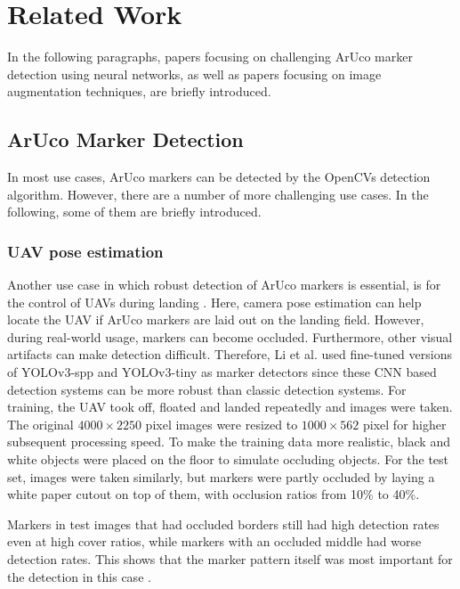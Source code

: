 \documentclass[10pt]{book}
\begin{document}
\chapter{Related Work}
\label{chap:relatedw}

In the following paragraphs, papers focusing on challenging \ac{ArUco} marker detection using neural networks, as well as papers focusing on image augmentation techniques, are briefly introduced.

\section{ArUco Marker Detection}

In most use cases, \ac{ArUco} markers can be detected by the \acp{OpenCV} detection algorithm. However, there are a number of more challenging use cases. In the following, some of them are briefly introduced.

\subsection{UAV pose estimation}

Another use case in which robust detection of \ac{ArUco} markers is essential, is for the control of \acp{UAV} during landing \cite{li2020aruco}. Here, camera pose estimation can help locate the \ac{UAV} if \ac{ArUco} markers are laid out on the landing field. However, during real-world usage, markers can become occluded. Furthermore, other visual artifacts can make detection difficult. Therefore, Li et al. used fine-tuned versions of \ac{YOLO}v3-spp and \ac{YOLO}v3-tiny as marker detectors since these \ac{CNN} based detection systems can be more robust than classic detection systems. For training, the \ac{UAV} took off, floated and landed repeatedly and images were taken. The original $4000 \times 2250$ pixel images were resized to $1000 \times 562$ pixel for higher subsequent processing speed. To make the training data more realistic, black and white objects were placed on the floor to simulate occluding objects. For the test set, images were taken similarly, but markers were partly occluded by laying a white paper cutout on top of them, with occlusion ratios from 10\% to 40\%. 

Markers in test images that had occluded borders still had high detection rates even at high cover ratios, while markers with an occluded middle had worse detection rates. This shows that the marker pattern itself was most important for the detection in this case \cite{li2020aruco}.
\end{document}

